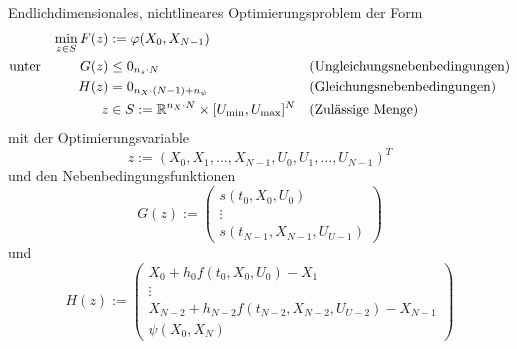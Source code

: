 \begin{problem}\label{prob:EndNichtOpt}
    Endlichdimensionales, nichtlineares Optimierungsproblem der Form
    \begin{align*}
        \min_{z \in S} F(z) &:= \varphi(X_0,X_{N-1}) & & \\
        \text{unter} \hspace{10mm} G(z) &\leq 0_{n_s \cdot N} & &  \text{(Ungleichungsnebenbedingungen)} \\
        H(z) &= 0_{n_X \cdot (N-1) + n_{\psi}} & & \text{(Gleichungsnebenbedingungen)}\\
        z &\in S := \R^{n_X \cdot N} \times [U_{\min},U_{\max}]^{N} & &  \text{(Zulässige Menge)}
    \end{align*}
    mit der Optimierungsvariable
    \begin{equation}
        z := (X_0,X_1,...,X_{N-1},U_0,U_1,...,U_{N-1})^T
    \end{equation}
    und den Nebenbedingungsfunktionen 
    \begin{equation}
        G(z) := 
        \begin{pmatrix}
            s(t_0,X_0,U_0) \\ 
            \vdots \\ 
            s(t_{N-1},X_{N-1},U_{U-1})
        \end{pmatrix} 
    \end{equation}
    und
    \begin{equation}
        H(z) := 
        \begin{pmatrix}
            X_0 + h_0 f(t_0,X_0,U_0) - X_1 \\ 
            \vdots \\ 
            X_{N-2} + h_{N-2} f(t_{N-2},X_{N-2},U_{U-2}) - X_{N-1} \\
            \psi(X_0,X_N)
        \end{pmatrix} 
    \end{equation}
\end{problem}

